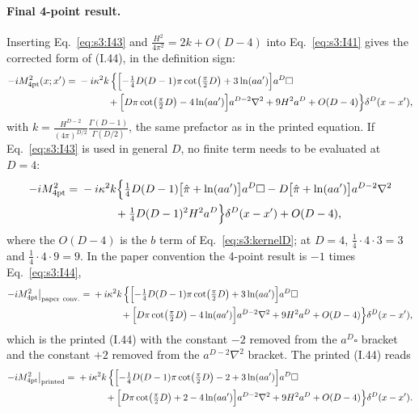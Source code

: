 \documentclass[aps,prd,onecolumn,10pt,nofootinbib,floatfix]{revtex4-2}
\newcommand{\eqI}[1]{(I.#1)}
\newcommand{\pihat}{\hat\pi}
\begin{document}
\paragraph*{Final 4-point result.}
Inserting Eq.~\eqref{eq:s3:I43} and $\frac{H^2}{4\pi^2}=2k+O(D-4)$ into Eq.~\eqref{eq:s3:I41}
gives the corrected form of \eqI{44}, in the definition sign:
\begin{equation}\label{eq:s3:I44}
\begin{aligned}
-iM^2_{\rm 4pt}(x;x')={}&-i\kappa^2k\,\Bigl\{\Bigl[-\tfrac14D(D-1)\pi\cot\bigl(\tfrac\pi2D\bigr)+3\ln(aa')\Bigr]a^D\square\\
&\qquad\quad+\Bigl[D\pi\cot\bigl(\tfrac\pi2D\bigr)-4\ln(aa')\Bigr]a^{D-2}\nabla^2+9H^2a^D+O(D-4)\Bigr\}\delta^D(x-x') ,
\end{aligned}
\end{equation}
with $k=\frac{H^{D-2}}{(4\pi)^{D/2}}\frac{\Gamma(D-1)}{\Gamma(D/2)}$, the same prefactor as in the
printed equation. If Eq.~\eqref{eq:s3:I43} is used in general $D$, no finite term needs to be
evaluated at $D=4$:
\begin{equation}\label{eq:s3:I44exact}
\begin{aligned}
-i\sthreeM={}&-i\kappa^2k\Bigl\{\tfrac14D(D-1)\bigl[\pihat+\ln(aa')\bigr]a^D\square
-D\bigl[\pihat+\ln(aa')\bigr]a^{D-2}\nabla^2\\
&\qquad\quad+\tfrac14D(D-1)^2H^2a^D\Bigr\}\sthreedel+O(D-4),
\end{aligned}
\end{equation}
where the $O(D-4)$ is the $b$ term of Eq.~\eqref{eq:s3:kernelD}; at $D=4$,
$\frac14\cdot4\cdot3=3$ and $\frac14\cdot4\cdot9=9$. In the paper convention the 4-point result
is $-1$ times Eq.~\eqref{eq:s3:I44},
\begin{equation}\label{eq:s3:I44paper}
\begin{aligned}
-i\sthreeM\big|_{\rm paper\ conv.}={}&+i\kappa^2k\,\Bigl\{\Bigl[-\tfrac14D(D-1)\pi\cot\bigl(\tfrac\pi2D\bigr)
+3\ln(aa')\Bigr]a^D\square\\
&\qquad\quad+\Bigl[D\pi\cot\bigl(\tfrac\pi2D\bigr)-4\ln(aa')\Bigr]a^{D-2}\nabla^2+9H^2a^D+O(D-4)\Bigr\}\sthreedel ,
\end{aligned}
\end{equation}
which is the printed \eqI{44} with the constant $-2$ removed from the $a^D\square$ bracket and the
constant $+2$ removed from the $a^{D-2}\nabla^2$ bracket. The printed \eqI{44} reads
\begin{equation}\label{eq:s3:I44printed}
\begin{aligned}
-iM^2_{\rm 4pt}\big|_{\rm printed}={}&+i\kappa^2k\,\Bigl\{\Bigl[-\tfrac14D(D-1)\pi\cot\bigl(\tfrac\pi2D\bigr)
-2+3\ln(aa')\Bigr]a^D\square\\
&\qquad\quad+\Bigl[D\pi\cot\bigl(\tfrac\pi2D\bigr)+2-4\ln(aa')\Bigr]a^{D-2}\nabla^2+9H^2a^D+O(D-4)\Bigr\}\delta^D(x-x') .
\end{aligned}
\end{equation}
\end{document}
